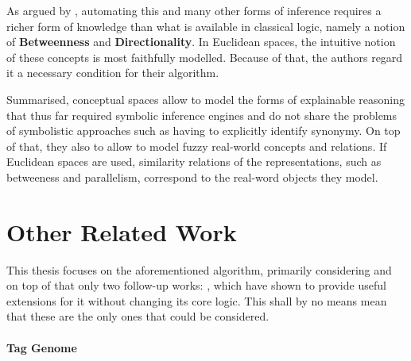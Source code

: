 
As argued by \textcite{Derrac2015}, automating this and many other forms of inference requires a richer form of knowledge than what is available in classical logic, namely a notion of \textbf{Betweenness} and \textbf{Directionality}. In Euclidean spaces, the intuitive notion of these concepts is most faithfully modelled. Because of that, the authors regard it a necessary condition for their algorithm.

Summarised, conceptual spaces allow to model the forms of explainable reasoning that thus far required symbolic inference engines and do not share the problems of symbolistic approaches such as having to explicitly identify synonymy. On top of that, they also to allow to model fuzzy real-world concepts and relations. If Euclidean spaces are used, similarity relations of the representations, such as betweeness and parallelism, correspond to the real-word objects they model.



\section{Other Related Work}
\label{sec:otherwork}

This thesis focuses on the aforementioned algorithm, primarily considering \cite{Derrac2015} and on top of that only two follow-up works: \cite{Ager2018, Alshaikh2020}, which have shown to provide useful extensions for it without changing its core logic. This shall by no means mean that these are the only ones that could be considered.

\paragraph{Tag Genome} 

